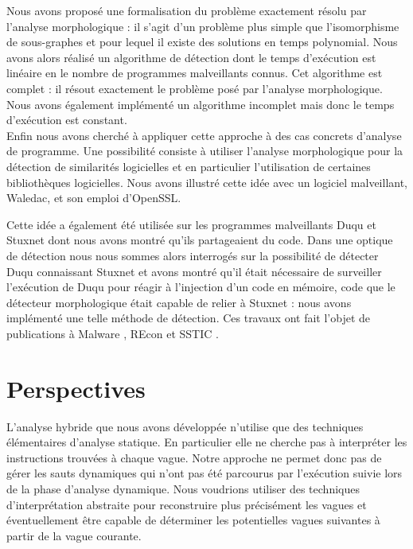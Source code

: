 Nous avons proposé une formalisation du problème exactement résolu par l'analyse morphologique : il s'agit d'un problème plus simple que l'isomorphisme de sous-graphes et pour lequel il existe des solutions en temps polynomial.
Nous avons alors réalisé un algorithme de détection dont le temps d'exécution est linéaire en le nombre de programmes malveillants connus. Cet algorithme est complet : il résout exactement le problème posé par l'analyse morphologique.
Nous avons également implémenté un algorithme incomplet mais donc le temps d'exécution est constant.
\\

Enfin nous avons cherché à appliquer cette approche à des cas concrets d'analyse de programme.
Une possibilité consiste à utiliser l'analyse morphologique pour la détection de similarités logicielles et en particulier l'utilisation de certaines bibliothèques logicielles.
Nous avons illustré cette idée avec un logiciel malveillant, Waledac, et son emploi d'OpenSSL.

Cette idée a également été utilisée sur les programmes malveillants Duqu et Stuxnet dont nous avons montré qu'ils partageaient du code.
Dans une optique de détection nous nous sommes alors interrogés sur la possibilité de détecter Duqu connaissant Stuxnet et avons montré qu'il était nécessaire de surveiller l'exécution de Duqu pour réagir à l'injection d'un code en mémoire, code que le détecteur morphologique était capable de relier à Stuxnet : nous avons implémenté une telle méthode de détection.
Ces travaux ont fait l'objet de publications à Malware \cite{mal12,mal13}, REcon \cite{REAT12} et SSTIC \cite{sstic13}.







\section*{Perspectives}
L'analyse hybride que nous avons développée n'utilise que des techniques élémentaires d'analyse statique.
En particulier elle ne cherche pas à interpréter les instructions trouvées à chaque vague. 
Notre approche ne permet donc pas de gérer les sauts dynamiques qui n'ont pas été parcourus par l'exécution suivie lors de la phase d'analyse dynamique.
Nous voudrions utiliser des techniques d’interprétation abstraite pour reconstruire plus précisément les vagues et éventuellement être capable de déterminer les potentielles vagues suivantes à partir de la vague courante.

